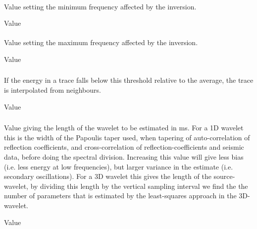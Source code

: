 \paragraph{}
 \slist
   \item \Description Value setting the minimum frequency affected by the inversion.
   \item \Argument Value
   \item {}
 \elist

\paragraph{}
 \slist
   \item \Description Value setting the maximum frequency affected by the inversion.
   \item \Argument Value
   \item {}
 \elist

\subsubsection{}
 \slist
   \item \Description If the energy in a trace falls below this threshold relative to the average, the trace is interpolated from neighbours.
   \item \Argument Value
   \item {}
 \elist

\subsubsection{}
 \slist
   \item \Description Value giving the length of the wavelet to be estimated in ms. For a 1D wavelet this is the width of the Papoulis taper used, when 
tapering of auto-correlation of reflection coefficients, and cross-correlation of reflection-coefficients and seismic data,
before doing the spectral division.  Increasing this value will give less bias (i.e. less energy at low frequencies), but larger 
variance in the estimate (i.e. secondary oscillations).   For a 3D wavelet this gives the length of the source-wavelet, by dividing this length by 
the vertical sampling interval we find the the number of parameters that is estimated  by the least-squares approach in the 3D-wavelet. 
   \item \Argument Value
   \item {}
 \elist


